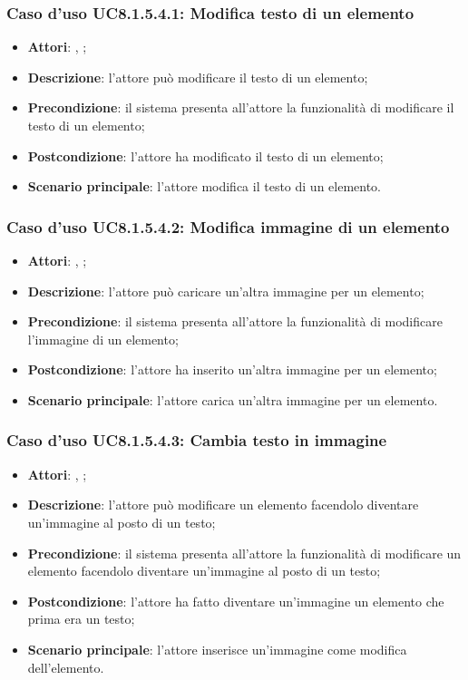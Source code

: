		\subsubsection{Caso d'uso UC8.1.5.4.1: Modifica testo di un elemento}
		\begin{itemize}
			\item \textbf{Attori}: \uau, \uaupro;
			\item \textbf{Descrizione}: l'attore può modificare il testo di un elemento;
			\item \textbf{Precondizione}: il sistema presenta all'attore la funzionalità di modificare il testo di un elemento;
			\item \textbf{Postcondizione}: l'attore ha modificato il testo di un elemento;
			\item \textbf{Scenario principale}: l'attore modifica il testo di un elemento.  
		\end{itemize}
		
		\subsubsection{Caso d'uso UC8.1.5.4.2: Modifica immagine di un elemento}
		\begin{itemize}
			\item \textbf{Attori}: \uau, \uaupro;
			\item \textbf{Descrizione}: l'attore può caricare un'altra immagine per un elemento;
			\item \textbf{Precondizione}: il sistema presenta all'attore la funzionalità di modificare l'immagine di un elemento; 
			\item \textbf{Postcondizione}: l'attore ha inserito un'altra immagine per un elemento;
			\item \textbf{Scenario principale}: l'attore carica un'altra immagine per un elemento.
		\end{itemize}
		
		\subsubsection{Caso d'uso UC8.1.5.4.3: Cambia testo in immagine}
		\begin{itemize}
			\item \textbf{Attori}: \uau, \uaupro;
			\item \textbf{Descrizione}: l'attore può modificare un elemento facendolo diventare un'immagine al posto di un testo;
			\item \textbf{Precondizione}: il sistema presenta all'attore la funzionalità di modificare un elemento facendolo diventare un'immagine al posto di un testo;
			\item \textbf{Postcondizione}: l'attore ha fatto diventare un'immagine un elemento che prima era un testo;
			\item \textbf{Scenario principale}: l'attore inserisce un'immagine come modifica dell'elemento.  
		\end{itemize}
		
